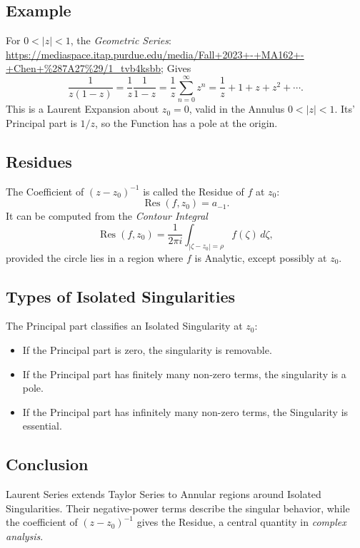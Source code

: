 \documentclass[a4paper, 10pt, onepage]{elegantbook}
\begin{document}
\subsection{Example}

For \(0<|z|<1\), the \emph{Geometric Series}: \url{https://mediaspace.itap.purdue.edu/media/Fall+2023+-+MA162+-+Chen+%287A27%29/1_tvb4ksbb}; Gives
\[
\frac{1}{z(1-z)}
=\frac{1}{z}\frac{1}{1-z}
=\frac{1}{z}\sum_{n=0}^{\infty}z^n
=\frac{1}{z}+1+z+z^2+\cdots.
\]
This is a Laurent Expansion about \(z_0=0\), valid in the Annulus \(0<|z|<1\). Its' Principal part is \(1/z\), so the Function has a pole at the origin.

\subsection{Residues}

The Coefficient of \((z-z_0)^{-1}\) is called the Residue of \(f\)
at \(z_0\):
\[
\operatorname{Res}(f,z_0)=a_{-1}.
\]
It can be computed from the \emph{Contour Integral}
\[
\operatorname{Res}(f,z_0)
=
\frac{1}{2\pi i}
\int_{|\zeta-z_0|=\rho}f(\zeta)\,d\zeta,
\]
provided the circle lies in a region where \(f\) is Analytic, except possibly at \(z_0\).

\subsection{Types of Isolated Singularities}

The Principal part classifies an Isolated Singularity at \(z_0\):
\begin{itemize}
  \item If the Principal part is zero, the singularity is removable.
  \item If the Principal part has finitely many non-zero terms, the
        singularity is a pole.
  \item If the Principal part has infinitely many non-zero terms, the
        Singularity is essential.
\end{itemize}

\subsection{Conclusion}

Laurent Series extends Taylor Series to Annular regions around Isolated Singularities. Their negative-power terms describe the singular behavior, while the coefficient of \((z-z_0)^{-1}\) gives the Residue, a central quantity in \emph{complex analysis}.
\end{document}
